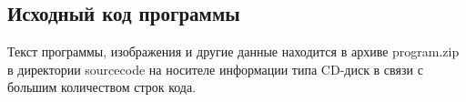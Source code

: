 \subsection{Исходный код программы}
Текст программы, изображения и другие данные находится в архиве program.zip в директории sourcecode на носителе информации типа CD-диск в связи с большим количеством строк кода.

